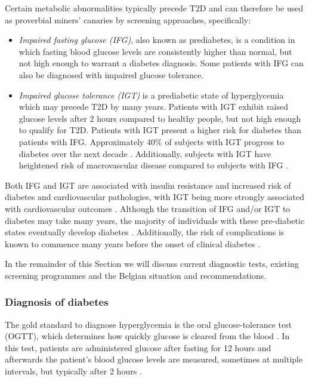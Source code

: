 Certain metabolic abnormalities typically precede T2D and can therefore be used as proverbial miners' canaries by screening approaches, specifically:
\begin{itemize}
\item \emph{Impaired fasting glucose (IFG)}, also known as prediabetes, is a condition in which fasting blood glucose levels are consistently higher than normal, but not high enough to warrant a diabetes diagnosis. Some patients with IFG can also be diagnosed with impaired glucose tolerance.
\item \emph{Impaired glucose tolerance (IGT)} is a prediabetic state of hyperglycemia which may precede T2D by many years. Patients with IGT exhibit raised glucose levels after 2 hours compared to healthy people, but not high enough to qualify for T2D. Patients with IGT present a higher risk for diabetes than patients with IFG. Approximately $40\%$ of subjects with IGT progress to diabetes over the next decade \citep{zimmet2001global}. Additionally, subjects with IGT have heightened risk of macrovascular disease compared to subjects with IFG \citep{tominaga1999impaired, unwin2002impaired}.
\end{itemize}
Both IFG and IGT are associated with insulin resistance and increased risk of diabetes and cardiovascular pathologies, with IGT being more strongly associated with cardiovascular outcomes \citep{unwin2002impaired}. Although the transition of IFG and/or IGT to diabetes may take many years, the majority of individuals with these pre-diabetic states eventually develop diabetes \cite{tuomilehto2001prevention,diabetes2002reduction,nathan2007impaired}. Additionally, the risk of complications is known to commence many years before the onset of clinical diabetes \cite{haffner1990cardiovascular,zimmet2001global}.

In the remainder of this Section we will discuss current diagnostic tests, existing screening programmes and the Belgian situation and recommendations.



\subsubsection{Diagnosis of diabetes} 
The gold standard to diagnose hyperglycemia is the oral glucose-tolerance test (OGTT), which determines how quickly glucose is cleared from the blood \citep{alberti1998definition, world2006definition}. In this test, patients are administered glucose after fasting for 12 hours and afterwards the patient's blood glucose levels are measured, sometimes at multiple intervals, but typically after 2 hours \citep{diabetesliga}.

